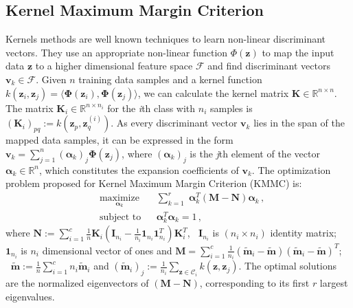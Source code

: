 \documentclass[runningheads]{llncs}
\begin{document}
\subsection{Kernel Maximum Margin Criterion}
\label{ssec:KMMC}
Kernels methods are well known techniques to learn non-linear discriminant vectors. They use an appropriate non-linear function $\Phi(\mathbf{z})$ to map the input data $\mathbf{z}$ to a higher dimensional feature space $\mathcal{F}$ and find discriminant vectors $\mathbf{v}_k \in \mathcal{F}$. Given $n$ training data samples and a kernel function $k(\mathbf{z}_i, \mathbf{z}_j) = \langle \mathbf{\Phi}(\mathbf{z}_i), \mathbf{\Phi}(\mathbf{z}_j) \rangle $, we can calculate the kernel matrix $\mathbf{K}\in \mathbb{R}^{n \times n}$. The matrix $\mathbf{K}_i \in \mathbb{R}^{n \times n_i}$
for the \textit{i}th class with $n_i$ samples is $(\mathbf{K}_i)_{pq}:=k(\mathbf{z}_p,\mathbf{z}_q^{(i)})$. As every discriminant vector $\mathbf{v}_k$ lies in the span of the mapped data samples, it can be expressed in the form $\mathbf{v}_k = \sum _{j=1}^{n} (\bm{\alpha}_{k})_j \mathbf{\Phi}(\mathbf{z}_j)$,
where $(\bm{\alpha}_{k})_j$ is the \textit{j}th element of the vector $\bm{\alpha}_{k} \in \mathbb{R}^{n}$, which constitutes the expansion coefficients of $\mathbf{v}_k$.
The optimization problem proposed for Kernel Maximum Margin Criterion (KMMC)\cite{haifeng:mmc} is:
\begin{equation}
\begin{aligned}
& \underset{\bm{\alpha}_{k}}{\text{maximize}} & & \sum\limits_{k=1}^r \;  \bm{\alpha}^T_{k} (\mathbf{M}  -  \mathbf{N}) \bm{\alpha}_{k} \,,\\
\label{eqn:KMMCFinal}
& \text{subject to}     & & \bm{\alpha}^T_{k} \bm{\alpha}_{k} = 1 \,,
\end{aligned}
\end{equation}
where $\mathbf{N}:= \sum_{i = 1}^{c} \frac{1}{n} \mathbf{K}_i(\mathbf{I}_{n_i}- \frac{1}{n_i} \mathbf{1}_{n_i}\mathbf{1}_{n_i}^T)\mathbf{K}_i^T$,
$\;\; \mathbf{I}_{n_i}$ is $(n_i \times n_i)$ identity matrix; $\mathbf{1}_{n_i}$ is $n_i$ dimensional vector of ones and
$\mathbf{M}=\sum_{i = 1}^{c} \frac{1}{n_i} (\widetilde{\mathbf{m}}_i-\widetilde{\mathbf{m}})(\widetilde{\mathbf{m}}_i- \widetilde{\mathbf{m}})^T$;
$\;\;\widetilde{\mathbf{m}} := \frac{1}{n} \sum_{i=1}^{c} n_i \widetilde{\mathbf{m}}_i$ and $(\widetilde{\mathbf{m}}_i)_j := \frac{1}{n_i}  \sum_{\mathbf{z} \in \mathcal{C}_i}    k(\mathbf{z},\mathbf{z}_j)$.
 The optimal solutions are the normalized eigenvectors of ${(\mathbf{M} - \mathbf{N})}$, corresponding to its first $r$ largest eigenvalues.
\end{document}
